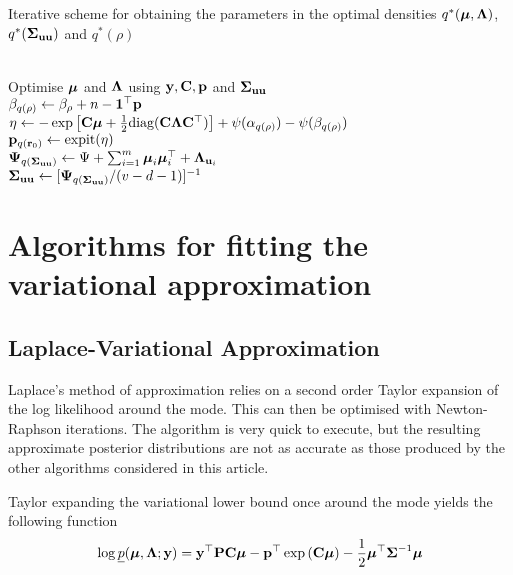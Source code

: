 \documentclass{article}[12pt]
\begin{document}
\begin{algorithm}
\caption[Algorithm 1]{Iterative scheme for obtaining the parameters in the
optimal densities $q^*({\boldsymbol \mu}, {\boldsymbol \Lambda})$, $q^*({\boldsymbol \Sigma}_{{\bf u} {\bf u}})$ and $q^*(\rho)$}
\label{alg:algorithm_one}
\begin{algorithmic}
 \\[1ex]
\STATE Optimise ${\boldsymbol \mu}$ and ${\boldsymbol \Lambda}$ using ${\bf y}, {\bf C}, {\bf p}$ and ${\boldsymbol \Sigma}_{{\bf u} {\bf u}}$ \\[1ex]
\STATE $\beta_{q(\rho)} \leftarrow \beta_\rho + n - {\bf 1}^\top{\bf p}$ \\[1ex]
\STATE $\eta \leftarrow -\exp \left [ {\bf C} {\boldsymbol \mu} + {\frac{1}{2}} \text{diag}{({\bf C}{\boldsymbol\Lambda}{\bf C}^\top)} \right ] + \psi{(\alpha_{q{(\rho)}})} - \psi{(\beta_{q{(\rho)}})}$ \\[1ex]
\STATE ${\bf p}_{q({\bf r}_0)} \leftarrow \text{expit} (\eta)$ \\[1ex]
\STATE ${\boldsymbol \Psi}_{q({\boldsymbol \Sigma}_{{\bf u} {\bf u}})} \leftarrow \Psi + \sum_{i=1}^m {\boldsymbol \mu}_i {\boldsymbol \mu}_i^\top + {\boldsymbol \Lambda}_{{{\bf u}}_i}$ \\[1ex]
\STATE ${\boldsymbol \Sigma}_{{\bf u}{\bf u}} \leftarrow [{\boldsymbol \Psi}_{q({\boldsymbol \Sigma}_{{\bf u} {\bf u}})}/(v - d - 1)]^{-1}$
\ENDWHILE
\end{algorithmic}
\end{algorithm}


\section{Algorithms for fitting the variational approximation}
\subsection{Laplace-Variational Approximation}
Laplace's method of approximation relies on a second order Taylor expansion of the
log likelihood around the mode. This can then be optimised with Newton-Raphson
iterations. The algorithm is very quick to execute, but the resulting approximate
posterior distributions are not as accurate as those produced by the other algorithms
considered in this article.

\noindent Taylor expanding the variational lower bound once around the mode yields the following function
\begin{align*}
\log \underline{p}({\boldsymbol \mu}, {\boldsymbol \Lambda}; {\bf y}) = {\bf y}^\top{\bf P}{\bf C}{\boldsymbol\mu} - {\bf p}^\top\exp \left ({\bf C} {\boldsymbol \mu} \right ) - {\frac{1}{2}} {\boldsymbol \mu}^\top {\boldsymbol\Sigma}^{-1} {\boldsymbol \mu}
\end{align*}
\end{document}

